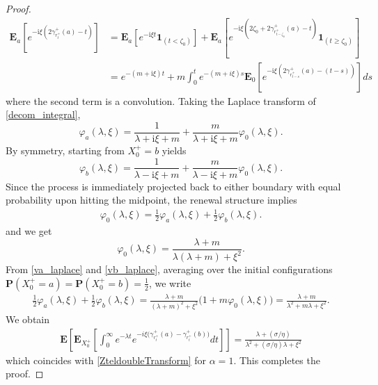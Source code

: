 \documentclass[10pt,a4paper]{article}
\numberwithin{equation}{section}
\theoremstyle{plain}
\theoremstyle{remark}
\begin{document}
\begin{proof}
\begin{align}
\mathbf{E}_a\left[ e^{-\text{i}\xi \left(2\gamma^+_{r^+_t}(a) - t\right)} \right]  & = \mathbf{E}_a\left[ e^{-\text{i}\xi t} \mathbf{1}_{(t < \zeta_0)} \right] + \mathbf{E}_a\left[ e^{-\text{i}\xi \left(2\zeta_0 + 2\gamma^+_{r^+_{t-\zeta_0}}(a) - t\right)} \mathbf{1}_{(t \geq \zeta_0)} \right] \nonumber \\
&= e^{-\left(m + \text{i}\xi\right)t} + m \int_0^t e^{-(m + i \xi ) s} \mathbf{E}_0\left[ e^{-\text{i}\xi \left(2\gamma^+_{r^+_{t-s}}(a) - (t-s)\right)} \right] ds
\label{decom_integral}
\end{align}
where the second term is a convolution. Taking the Laplace transform of \eqref{decom_integral}, 
\begin{equation}
\varphi_a(\lambda, \xi) = \frac{1}{\lambda + \text{i}\xi + m} + \frac{m}{\lambda + \text{i}\xi + m} \varphi_0(\lambda, \xi).
\label{va_laplace}
\end{equation}
By symmetry, starting from $X^+_0 = b$ yields
\begin{equation}
\varphi_b(\lambda, \xi) = \frac{1}{\lambda - \text{i}\xi + m} + \frac{m}{\lambda - \text{i}\xi + m} \varphi_0(\lambda, \xi).
\label{vb_laplace}
\end{equation}
Since the process is immediately projected back to either boundary with equal probability upon hitting the midpoint, the renewal structure implies 
\begin{align*}
\varphi_0(\lambda, \xi) = \frac{1}{2} \varphi_a(\lambda, \xi) + \frac{1}{2} \varphi_b(\lambda, \xi).
\end{align*}
and we get
\begin{equation}
\varphi_0(\lambda, \xi) = \frac{\lambda+m}{\lambda (\lambda + m) + \xi^2}.
\label{v0_sol}
\end{equation}
From \eqref{va_laplace} and \eqref{vb_laplace}, averaging over the initial configurations $\mathbf{P}(X^+_0 = a) = \mathbf{P}(X^+_0 = b) = \frac{1}{2}$, we write
\begin{align*}
\frac{1}{2} \varphi_a(\lambda, \xi) + \frac{1}{2} \varphi_b(\lambda, \xi) = \frac{\lambda+m}{(\lambda+ m)^2 + \xi^2} \big( 1 + m \varphi_0(\lambda, \xi) \big) = \frac{\lambda + m}{\lambda^2 + m\lambda + \xi^2}.
\end{align*}
We obtain 
\begin{align*}
\mathbf{E} \left[ \mathbf{E}_{X^+_0} \left[ \int_0^\infty e^{-\lambda t} e^{-i\xi \big( \gamma^+_{r^+_t}(a) - \gamma^+_{r^+_t}(b) \big)} dt \right] \right] = \frac{\lambda + (\sigma/\eta)}{\lambda^2 + (\sigma/\eta) \lambda + \xi^2}
\end{align*}
which coincides with \eqref{ZteldoubleTransform} for $\alpha=1$. This completes the proof.
\end{proof}
\end{document}
